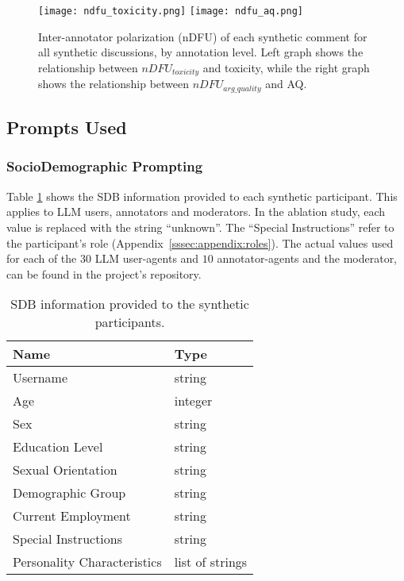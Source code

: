 \begin{figure*}[t]
    \texttt{[image: ndfu\_toxicity.png]} \hfill
    \texttt{[image: ndfu\_aq.png]}
	\centering
	\caption{Inter-annotator polarization (\ac{nDFU}) of each synthetic comment for all synthetic discussions, by annotation level. Left graph shows the relationship between $nDFU_{toxicity}$ and toxicity, while the right graph shows the relationship between $nDFU_{arg\_quality}$ and \ac{AQ}.}
    \label{fig:ndfu_annot}
\end{figure*}



\subsection{Prompts Used}
\label{ssec:appendix:prompts}


\subsubsection{SocioDemographic Prompting}
\label{sssec:appendix:sdbs}

Table \ref{tab:sdb} shows the \ac{SDB} information provided to each synthetic participant. This applies to \ac{LLM} users, annotators and moderators. In the ablation study, each value is replaced with the string “unknown”. The “Special Instructions” refer to the participant's role (Appendix~\ref{sssec:appendix:roles}). The actual values used for each of the $30$ \ac{LLM} user-agents and $10$ annotator-agents and the moderator, can be found in the project's repository\analysislink.

\begin{table}[h]
\centering
\begin{tabular}{|l|l|}
    \toprule
    Name & Type \\
    \midrule
    Username & string \\
    Age & integer \\
    Sex & string \\
    Education Level & string \\
    Sexual Orientation & string \\
    Demographic Group & string \\
    Current Employment & string \\
    Special Instructions & string \\
    Personality Characteristics & list of strings \\
    \bottomrule
\end{tabular}
\caption{\ac{SDB} information provided to the synthetic participants.}
\label{tab:sdb}
\end{table}
   
